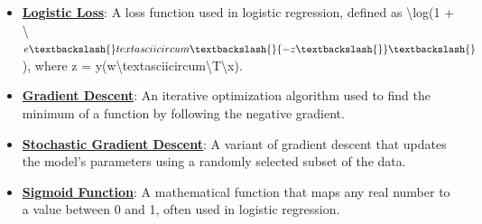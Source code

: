 \documentclass{article}%
\begin{document}
\begin{itemize}[leftmargin=*]
\item \href{https://purdue.brightspace.com/d2l/common/assets/pdfjs-d2l-dist/1.0.14-legacy/web/viewer.html?file=\%2Fcontent\%2Fenforced\%2F1095467-wl.202510.CS.24300.001\%2F05L2-ML Basics.pdf\%3Fou\%3D1095467\&lang=en-us\&container=d2l-fileviewer-rendered-pdf\&fullscreen=d2l-fileviewer-rendered-pdf-dialog\&height=667#page=27}{\textbf{Logistic Loss}}: A loss function used in logistic regression, defined as \textbackslash{}log(1 + \textbackslash{}$e\textbackslash{}textasciicircum{}\textbackslash{}{-z\textbackslash{}}\textbackslash{}$), where z = y(w\textbackslash{}textasciicircum{}\textbackslash{}{T\textbackslash{}}x).%
\item \href{https://purdue.brightspace.com/d2l/common/assets/pdfjs-d2l-dist/1.0.14-legacy/web/viewer.html?file=\%2Fcontent\%2Fenforced\%2F1095467-wl.202510.CS.24300.001\%2F05L2-ML Basics.pdf\%3Fou\%3D1095467\&lang=en-us\&container=d2l-fileviewer-rendered-pdf\&fullscreen=d2l-fileviewer-rendered-pdf-dialog\&height=667#page=28}{\textbf{Gradient Descent}}: An iterative optimization algorithm used to find the minimum of a function by following the negative gradient.%
\item \href{https://purdue.brightspace.com/d2l/common/assets/pdfjs-d2l-dist/1.0.14-legacy/web/viewer.html?file=\%2Fcontent\%2Fenforced\%2F1095467-wl.202510.CS.24300.001\%2F05L2-ML Basics.pdf\%3Fou\%3D1095467\&lang=en-us\&container=d2l-fileviewer-rendered-pdf\&fullscreen=d2l-fileviewer-rendered-pdf-dialog\&height=667#page=29}{\textbf{Stochastic Gradient Descent}}: A variant of gradient descent that updates the model's parameters using a randomly selected subset of the data.%
\item \href{https://purdue.brightspace.com/d2l/common/assets/pdfjs-d2l-dist/1.0.14-legacy/web/viewer.html?file=\%2Fcontent\%2Fenforced\%2F1095467-wl.202510.CS.24300.001\%2F05L2-ML Basics.pdf\%3Fou\%3D1095467\&lang=en-us\&container=d2l-fileviewer-rendered-pdf\&fullscreen=d2l-fileviewer-rendered-pdf-dialog\&height=667#page=32}{\textbf{Sigmoid Function}}: A mathematical function that maps any real number to a value between 0 and 1, often used in logistic regression.%
\end{itemize}%
\end{document}
